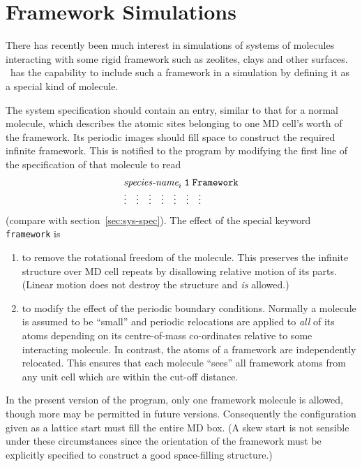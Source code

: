 \section{Framework Simulations}%

There has recently been much interest in simulations of systems of
molecules interacting with some rigid framework such as zeolites,
clays and other surfaces.  \moldy\  has the capability to include such a
framework in a simulation by defining it as a special kind of molecule.

The system specification should contain an entry, similar to that for
a normal molecule, which describes the atomic sites belonging to one
MD cell's worth of the framework.  Its periodic images should fill
space to construct the required infinite framework.  This is notified
to the program by modifying the first line of the specification of
that molecule to read
\begin{displaymath}
\begin{array}{lllllll}
\multicolumn{7}{l}{\mbox{{\it species-name}}_{i} {\tt \; 1 \; Framework}}  \\
\vdots & \vdots & \vdots & \vdots & \vdots & \vdots & \vdots \\
\end{array}
\end{displaymath}
(compare with section~\ref{sec:sys-spec}).  The effect of the special
keyword \verb'framework' is
\begin{enumerate}
\item to remove the rotational freedom of the molecule.  This
preserves the infinite structure over MD cell repeats by disallowing
relative motion of its parts. (Linear motion does not destroy the
structure and {\em is\/} allowed.)
\item to modify the effect of the periodic boundary conditions.
Normally a molecule is assumed to be ``small'' and periodic relocations
are applied to {\em all\/} of its atoms depending on its centre-of-mass
co-ordinates relative to some interacting molecule.  In contrast, the
atoms of a framework are independently relocated.  This ensures that
each molecule ``sees'' all framework atoms from any unit cell which
are within the cut-off distance.
\end{enumerate}

In the present version of the program, only one framework molecule is
allowed, though more may be permitted in future versions. Consequently
the configuration given as a lattice start must fill the entire MD
box. (A skew start is not sensible under these circumstances since the
orientation of the framework must be explicitly specified to construct
a good space-filling structure.)

